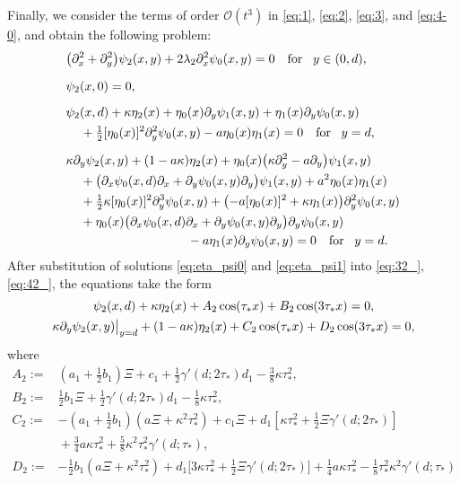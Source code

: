 \documentclass[oneside,a4paper,11pt]{article}
\theoremstyle{thmstyletwo}%
\theoremstyle{thmstylethree}%
\numberwithin{equation}{section}
\newcommand{\pd}[2][]{
\if\relax#1\relax
 \partial_{#2}%
\else
 \partial_{#2}^{#1}%
\fi}
\def\gamm{\gamma}
\def\taust{\tau_{*}}
\def\dUd{\kappa}
\def\mddU{a}
\def\Obig{\mathcal{O}}
\begin{document}
Finally, we consider the terms of order $\Obig(t^3)$ in \eqref{eq:1}, \eqref{eq:2}, \eqref{eq:3}, and \eqref{eq:4-0}, and obtain the following problem:
\begin{align}
&\bigl(\pd[2]{x}+\pd[2]{y}\bigr)\psi_{2}(x , y)+2\lambda_2\pd[2]{x}\psi_0(x,y)=0\quad\mbox{for\!}\quad y\in (0,d),\label{eq:12}\\[2mm]
&\psi_2(x,0)=0,\label{eq:22}\\[2mm]
&\psi_2(x,d)+\dUd\eta_2(x)+\eta_0(x)\pd{y}\psi_1(x,y)+\eta_1(x)\pd{y}\psi_0(x,y) \notag\\
&\kern4mm{} +\tfrac12[\eta_0(x)]^2\pd[2]{y}\psi_0(x,y) -
\mddU\eta_0(x)\eta_1(x)=0\quad \mbox{for\!}\quad y=d,\label{eq:32_}\\[2mm]
&\dUd\pd{y}\psi_2(x,y)+(1-\mddU\dUd)\eta_2(x)
+\eta_0(x)\bigl(\dUd\pd[2]{y}-\mddU\pd{y}\bigr)\psi_1(x,y)\notag\\
&\kern4mm{}
+\bigl(\pd{x}\psi_0(x,d)\pd{x}+\pd{y}\psi_0(x,y)\pd{y}\bigr)\psi_1(x,y) +
\mddU^2\eta_0(x)\eta_1(x)\notag\\
&\kern4mm{}
+\tfrac12 \dUd[\eta_0(x)]^2\pd[3]{y}\psi_0(x,y)+\bigl(-\mddU[\eta_0(x)]^2+\dUd\eta_1(x) \bigr)\pd[2]{y}\psi_0(x,y) \notag\\
&\kern4mm{}+
\eta_0(x)\bigl(
\pd{x}\psi_0(x,d)\pd{x}+\pd{y}\psi_0(x,y)\pd{y}\bigr)\pd{y}\psi_0(x,y) \notag\\
&\kern34mm{}-\mddU\eta_1(x)\pd{y}\psi_0(x,y)
=0\quad \mbox{for\!}\quad y=d.\label{eq:42_}
\end{align}
After substitution of solutions \eqref{eq:eta_psi0} and \eqref{eq:eta_psi1} into \eqref{eq:32_}, \eqref{eq:42_}, the equations
take the form
\begin{gather}
\psi_2(x,d)+\dUd\eta_2(x)+A_{2}\cos(\taust x)+B_{2}\cos(3\taust x)=0,\label{eq:32}\\
\dUd\pd{y}\psi_2(x,y)\bigr|_{y=d}+(1-\mddU\dUd)\eta_2(x)+C_2\cos(\taust x)+D_2\cos(3\taust x)=0,\label{eq:42}
\end{gather}
where 
\begin{equation}
\label{eq:ABCD2def}
\begin{aligned}
A_2:={}& (a_1+\tfrac12 b_1)\Xi +c_1
  + \tfrac12 \gamm'(d;2\taust)d_1 -\tfrac38\dUd \taust^2,\\
B_2:={}& \tfrac12 b_1\Xi + \tfrac12\gamm'(d;2\taust)d_1-\tfrac18\dUd \taust^2,\\
C_2:={}&  {-(a_1+\tfrac12 b_1)} ( \mddU\Xi + \dUd^2\taust^2 ) + c_1\Xi+ d_1 [\dUd\taust^2    + \tfrac12\Xi\gamm'(d;2\taust)]\\
&{} +\tfrac34\mddU\dUd\taust^2 + \tfrac58\dUd^2 \taust^2\gamm'(d;\taust) ,\\
D_2:={}&
{-\tfrac12 b_1 (\mddU\Xi + \dUd^2\taust^2)}
+ d_1\bigl[3\dUd\taust^2+ \tfrac12\Xi\gamm'(d;2\taust)\bigr]
+\tfrac14\mddU\dUd \taust^2  - \tfrac18\taust^2\dUd^2\gamm'(d;\taust)
\end{aligned}\!\!\!\!\!
\end{equation}
\end{document}
